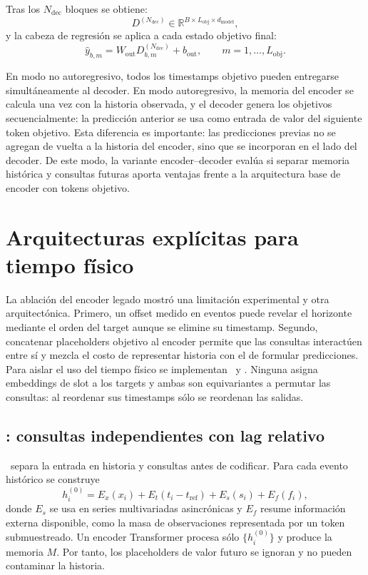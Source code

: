 Tras los $N_{\text{dec}}$ bloques se obtiene:
\[
    D^{(N_{\text{dec}})}
    \in
    \mathbb{R}^{B \times L_{\text{obj}} \times d_{\text{model}}},
\]
y la cabeza de regresión se aplica a cada estado objetivo final:
\[
    \hat{y}_{b,m}
    =
    W_{\text{out}} D^{(N_{\text{dec}})}_{b,m}
    +
    b_{\text{out}},
    \qquad m=1,\dots,L_{\text{obj}}.
\]

En modo no autoregresivo, todos los timestamps objetivo pueden entregarse simultáneamente al decoder. En modo autoregresivo, la memoria del encoder se calcula una vez con la historia observada, y el decoder genera los objetivos secuencialmente: la predicción anterior se usa como entrada de valor del siguiente token objetivo. Esta diferencia es importante: las predicciones previas no se agregan de vuelta a la historia del encoder, sino que se incorporan en el lado del decoder. De este modo, la variante encoder--decoder evalúa si separar memoria histórica y consultas futuras aporta ventajas frente a la arquitectura base de encoder con tokens objetivo.

\section{Arquitecturas explícitas para tiempo físico}
\label{sec:arquitecturas-tiempo-fisico}

La ablación del encoder legado mostró una limitación experimental y otra arquitectónica. Primero, un offset medido en eventos puede revelar el horizonte mediante el orden del target aunque se elimine su timestamp. Segundo, concatenar placeholders objetivo al encoder permite que las consultas interactúen entre sí y mezcla el costo de representar historia con el de formular predicciones. Para aislar el uso del tiempo físico se implementan \QueryCross\ y \ContinuousBasis. Ninguna asigna embeddings de slot a los targets y ambas son equivariantes a permutar las consultas: al reordenar sus timestamps sólo se reordenan las salidas.

\subsection{\QueryCross: consultas independientes con lag relativo}
\label{sec:query-cross}

\QueryCross\ separa la entrada en historia y consultas antes de codificar. Para cada evento histórico se construye
\begin{equation}
    h_i^{(0)}=E_x(x_i)+E_t(t_i-t_{\mathrm{ref}})+E_s(s_i)+E_f(f_i),
\end{equation}
donde $E_s$ se usa en series multivariadas asincrónicas y $E_f$ resume información externa disponible, como la masa de observaciones representada por un token submuestreado. Un encoder Transformer procesa sólo $\{h_i^{(0)}\}$ y produce la memoria $M$. Por tanto, los placeholders de valor futuro se ignoran y no pueden contaminar la historia.

